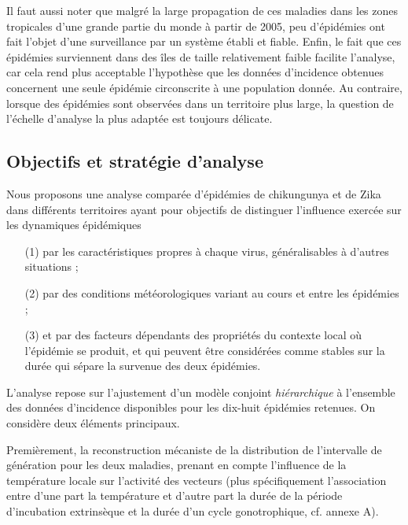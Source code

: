 Il faut aussi noter que malgré la large propagation de ces maladies dans les zones tropicales d'une grande partie du monde à partir de 2005, peu d'épidémies ont fait l'objet d'une surveillance par un système établi et fiable.
Enfin, le fait que ces épidémies surviennent dans des îles de taille relativement faible facilite l'analyse, car cela rend plus acceptable l'hypothèse que les données d'incidence obtenues concernent une seule épidémie circonscrite à une population donnée.
Au contraire, lorsque des épidémies sont observées dans un territoire plus large, la question de l'échelle d'analyse la plus adaptée est toujours délicate.

\subsection{Objectifs et stratégie d'analyse}
\label{sec:presenttsir}

Nous proposons une analyse comparée d'épidémies de chikungunya et de Zika dans différents territoires ayant pour objectifs de distinguer l'influence exercée sur les dynamiques épidémiques
\begin{enumerate}
\item[(1)] par les caractéristiques propres à chaque virus, généralisables à d'autres situations ;
\item[(2)] par des conditions météorologiques variant au cours et entre les épidémies ;
\item[(3)] et par des facteurs dépendants des propriétés du contexte local où l'épidémie se produit, et qui peuvent être considérées comme stables sur la durée qui sépare la survenue des deux épidémies.
\end{enumerate}
L'analyse repose sur l'ajustement d'un modèle conjoint {\em hiérarchique} à l'ensemble des données d'incidence disponibles pour les dix-huit épidémies retenues.
On considère deux éléments principaux.

Premièrement, la reconstruction mécaniste de la distribution de l'intervalle de génération pour les deux maladies, prenant en compte l'influence de la température locale sur l'activité des vecteurs (plus spécifiquement l'association entre d'une part la température et d'autre part la durée de la période d'incubation extrinsèque et la durée d'un cycle gonotrophique, cf. annexe A).

